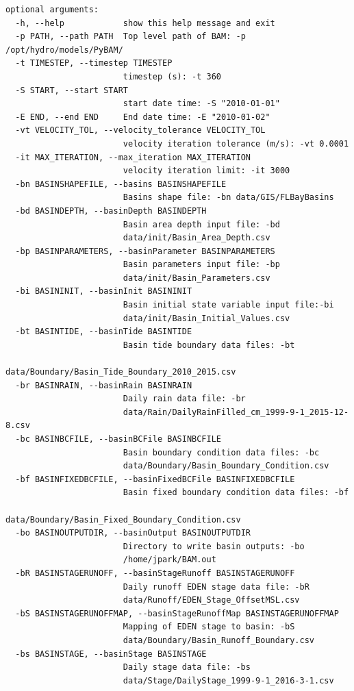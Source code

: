 \begin{verbatim}
optional arguments:
  -h, --help            show this help message and exit
  -p PATH, --path PATH  Top level path of BAM: -p /opt/hydro/models/PyBAM/
  -t TIMESTEP, --timestep TIMESTEP
                        timestep (s): -t 360
  -S START, --start START
                        start date time: -S "2010-01-01"
  -E END, --end END     End date time: -E "2010-01-02"
  -vt VELOCITY_TOL, --velocity_tolerance VELOCITY_TOL
                        velocity iteration tolerance (m/s): -vt 0.0001
  -it MAX_ITERATION, --max_iteration MAX_ITERATION
                        velocity iteration limit: -it 3000
  -bn BASINSHAPEFILE, --basins BASINSHAPEFILE
                        Basins shape file: -bn data/GIS/FLBayBasins
  -bd BASINDEPTH, --basinDepth BASINDEPTH
                        Basin area depth input file: -bd
                        data/init/Basin_Area_Depth.csv
  -bp BASINPARAMETERS, --basinParameter BASINPARAMETERS
                        Basin parameters input file: -bp
                        data/init/Basin_Parameters.csv
  -bi BASININIT, --basinInit BASININIT
                        Basin initial state variable input file:-bi
                        data/init/Basin_Initial_Values.csv
  -bt BASINTIDE, --basinTide BASINTIDE
                        Basin tide boundary data files: -bt
                        data/Boundary/Basin_Tide_Boundary_2010_2015.csv
  -br BASINRAIN, --basinRain BASINRAIN
                        Daily rain data file: -br
                        data/Rain/DailyRainFilled_cm_1999-9-1_2015-12-8.csv
  -bc BASINBCFILE, --basinBCFile BASINBCFILE
                        Basin boundary condition data files: -bc
                        data/Boundary/Basin_Boundary_Condition.csv
  -bf BASINFIXEDBCFILE, --basinFixedBCFile BASINFIXEDBCFILE
                        Basin fixed boundary condition data files: -bf
                        data/Boundary/Basin_Fixed_Boundary_Condition.csv
  -bo BASINOUTPUTDIR, --basinOutput BASINOUTPUTDIR
                        Directory to write basin outputs: -bo
                        /home/jpark/BAM.out
  -bR BASINSTAGERUNOFF, --basinStageRunoff BASINSTAGERUNOFF
                        Daily runoff EDEN stage data file: -bR
                        data/Runoff/EDEN_Stage_OffsetMSL.csv
  -bS BASINSTAGERUNOFFMAP, --basinStageRunoffMap BASINSTAGERUNOFFMAP
                        Mapping of EDEN stage to basin: -bS
                        data/Boundary/Basin_Runoff_Boundary.csv
  -bs BASINSTAGE, --basinStage BASINSTAGE
                        Daily stage data file: -bs
                        data/Stage/DailyStage_1999-9-1_2016-3-1.csv

\end{verbatim}
